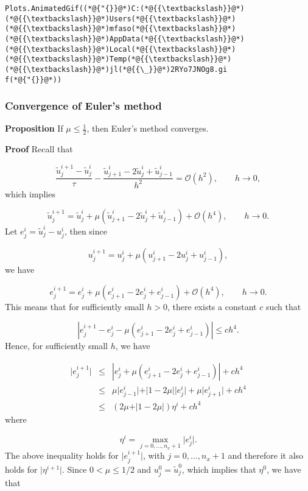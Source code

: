 \documentclass[12pt,a4paper]{article}
\begin{document}
\begin{lstlisting}
Plots.AnimatedGif((*@{"{}}@*)C:(*@{{\textbackslash}}@*)(*@{{\textbackslash}}@*)Users(*@{{\textbackslash}}@*)(*@{{\textbackslash}}@*)mfaso(*@{{\textbackslash}}@*)(*@{{\textbackslash}}@*)AppData(*@{{\textbackslash}}@*)(*@{{\textbackslash}}@*)Local(*@{{\textbackslash}}@*)(*@{{\textbackslash}}@*)Temp(*@{{\textbackslash}}@*)(*@{{\textbackslash}}@*)jl(*@{{\_}}@*)2RYo7JNOg8.gi
f(*@{"{}}@*))
\end{lstlisting}


\subsubsection{Convergence of Euler's method}
\textbf{Proposition} If $\mu \leq \frac{1}{2}$, then Euler's method converges.

\textbf{Proof} Recall that

\[
\frac{\tilde{u}^{i+1}_j - \tilde{u}^i_j}{\tau} - \frac{\tilde{u}^{i}_{j+1} - 2\tilde{u}^i_j + \tilde{u}^i_{j-1}}{h^2}  =  \mathcal{O}(h^2), \qquad h \to 0,
\]
which implies

\[
\tilde{u}^{i+1}_j = \tilde{u}^i_j + \mu \left(\tilde{u}^{i}_{j+1} - 2\tilde{u}^i_j + \tilde{u}^i_{j-1}\right)  +  \mathcal{O}(h^4), \qquad h \to 0.
\]
Let $e^i_j = \tilde{u}^i_j - u^i_j$, then since

\[
u^{i+1}_j = u^i_j + \mu \left( u^{i}_{j+1} - 2u^i_j + u^i_{j-1}  \right),
\]
we have

\[
e^{i+1}_j = e^i_j + \mu \left( e^{i}_{j+1} - 2e^i_j + e^i_{j-1}  \right) + \mathcal{O}(h^4), \qquad h \to 0.
\]
This means that for sufficiently small $h > 0$, there exists a constant $c$ such that 

\[
\left\vert e^{i+1}_j -  e^i_j - \mu \left( e^{i}_{j+1} - 2e^i_j + e^i_{j-1}  \right) \right\vert  \leq ch^4.
\]
Hence, for sufficiently small $h$, we have


\begin{eqnarray*}
\vert e^{i+1}_j \vert &\leq& \left\vert e^i_j + \mu ( e^{i}_{j+1} - 2e^i_j + e^i_{j-1} ) \right\vert + ch^4\\
 & \leq & \mu \vert e^i_{j-1} \vert + \vert 1 - 2\mu \vert \vert e^i_{j} \vert  + \mu \vert e^i_{j+1} \vert + ch^4  \\
 & \leq & \left(2\mu  + \vert 1 - 2\mu \vert \right) \eta^i  + ch^4  
\end{eqnarray*}
where 

\[
\eta^{i} = \max_{j = 0, \ldots, n_x+1}\vert e^i_j \vert.
\]
The above inequality holds for $\vert e^{i+1}_j \vert$, with $j = 0, \ldots, n_x+1$ and therefore it also holds for $\vert  \eta^{i+1} \vert$. Since $0 < \mu \leq 1/2$ and $u^0_j = \tilde{u}^0_j$, which implies that $\eta^0$, we have that
\end{document}
